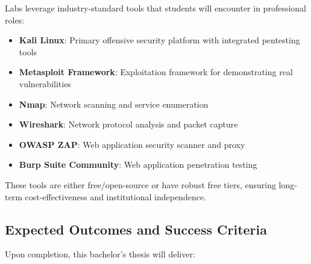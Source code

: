 Labs leverage industry-standard tools that students will encounter in professional roles:

\begin{itemize}
    \item \textbf{Kali Linux}: Primary offensive security platform with integrated 
          pentesting tools
    \item \textbf{Metasploit Framework}: Exploitation framework for demonstrating 
          real vulnerabilities
    \item \textbf{Nmap}: Network scanning and service enumeration
    \item \textbf{Wireshark}: Network protocol analysis and packet capture
    \item \textbf{OWASP ZAP}: Web application security scanner and proxy
    \item \textbf{Burp Suite Community}: Web application penetration testing
\end{itemize}

These tools are either free/open-source or have robust free tiers, ensuring 
long-term cost-effectiveness and institutional independence.

\subsection{Expected Outcomes and Success Criteria}

Upon completion, this bachelor's thesis will deliver:

